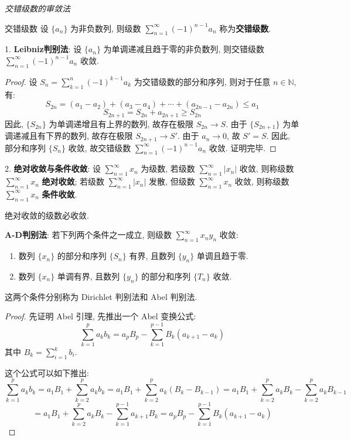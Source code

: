 \documentclass[a4paper,12pt]{ctexart}
\begin{document}
\textit{交错级数的审敛法}

\begin{mydef}{交错级数}{}
设 $\{a_n\}$ 为非负数列, 则级数 $\sum_{n=1}^{\infty} (-1)^{n-1} a_n$ 称为\textbf{交错级数}.
\end{mydef}

1. \textbf{Leibniz判别法}: 设 $\{a_n\}$ 为单调递减且趋于零的非负数列, 则交错级数 $\sum_{n=1}^{\infty} (-1)^{n-1} a_n$ 收敛.

\begin{proof}
设 $S_n = \sum_{k=1}^{n} (-1)^{k-1} a_k$ 为交错级数的部分和序列, 则对于任意 $n \in \mathbb{N}$, 有:
$$
S_{2n} = (a_1 - a_2) + (a_3 - a_4) + \cdots + (a_{2n-1} - a_{2n}) \leq a_1
$$
$$
S_{2n+1} = S_{2n} + a_{2n+1} \geq S_{2n}
$$
因此, $\{S_{2n}\}$ 为单调递增且有上界的数列, 故存在极限 $S_{2n} \to S$. 由于 $\{S_{2n+1}\}$ 为单调递减且有下界的数列, 故存在极限 $S_{2n+1} \to S'$. 由于 $a_n \to 0$, 故 $S' = S$. 因此, 部分和序列 $\{S_n\}$ 收敛, 故交错级数 $\sum_{n=1}^{\infty} (-1)^{n-1} a_n$ 收敛. 证明完毕.
\end{proof}

2. \textbf{绝对收敛与条件收敛}: 设 $\sum_{n=1}^{\infty} x_n$ 为级数, 若级数 $\sum_{n=1}^{\infty} |x_n|$ 收敛, 则称级数 $\sum_{n=1}^{\infty} x_n$ \textbf{绝对收敛}; 若级数 $\sum_{n=1}^{\infty} |x_n|$ 发散, 但级数 $\sum_{n=1}^{\infty} x_n$ 收敛, 则称级数 $\sum_{n=1}^{\infty} x_n$ \textbf{条件收敛}.

\begin{mythm}{}{}
绝对收敛的级数必收敛.
\end{mythm}

\textbf{A-D判别法}: 若下列两个条件之一成立, 则级数 $\sum_{n=1}^{\infty} x_n y_n$ 收敛:
\begin{enumerate}
    \item 数列 $\{x_n\}$ 的部分和序列 $\{S_n\}$ 有界, 且数列 $\{y_n\}$ 单调且趋于零.
    \item 数列 $\{x_n\}$ 单调有界, 且数列 $\{y_n\}$ 的部分和序列 $\{T_n\}$ 收敛.
\end{enumerate}
这两个条件分别称为 Dirichlet 判别法和 Abel 判别法.

\begin{proof}
先证明 Abel 引理, 先推出一个 Abel 变换公式:
$$
\sum_{k=1}^{p} a_k b_k = a_p B_p - \sum_{k=1}^{p-1} B_k (a_{k+1} - a_k)
$$
其中 $B_k = \sum_{i=1}^{k} b_i$.

这个公式可以如下推出:
$$
\sum_{k=1}^{p} a_k b_k = a_1B_1 + \sum_{k=2}^{p}a_kb_k = a_1B_1 + \sum_{k=2}^p a_k (B_k-B_{k-1}) = a_1B_1 + \sum_{k=2}^p a_k B_k - \sum_{k=2}^p a_k B_{k-1}
$$
$$= a_1B_1 + \sum_{k=2}^p a_k B_k - \sum_{k=1}^{p-1} a_{k+1} B_k = a_p B_p - \sum_{k=1}^{p-1} B_k (a_{k+1} - a_k)
$$
\end{proof}
\end{document}
